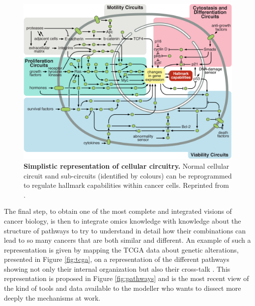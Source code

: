 \documentclass[a4paper,12pt,twoside,onecolumn,openright,final,oldfontcommands]{memoir}
\begin{document}
\begin{figure}

{\centering \includegraphics[width=0.9\linewidth]{fig/circuit} 

}

\caption[Simplistic representation of cellular circuit and pathways]{\textbf{Simplistic representation of cellular
circuitry.} Normal cellular circuit sand sub-circuits (identified by
colours) can be reprogrammed to regulate hallmark capabilities within
cancer cells. Reprinted from \citet{hanahan2011hallmarks}.}\label{fig:circuit}
\end{figure}






The final step, to obtain one of the most complete and integrated
visions of cancer biology, is then to integrate omics knowledge with
knowledge about the structure of pathways to try to understand in detail
how their combinations can lead to so many cancers that are both similar
and different. An example of such a representation is given by mapping
the TCGA data about genetic alterations, presented in Figure
\ref{fig:tcga}, on a representation of the different pathways showing
not only their internal organization but also their cross-talk
\citep{sanchez2018oncogenic}. This representation is proposed in Figure
\ref{fig:pathways} and is the most recent view of the kind of tools and
data available to the modeller who wants to dissect more deeply the
mechanisms at work.
\end{document}
